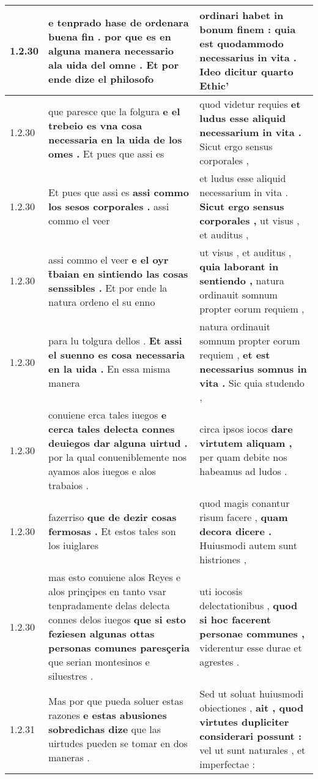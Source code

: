 \begin{tabular}{|p{1cm}|p{6.5cm}|p{6.5cm}|}
1.2.30 & e tenprado hase de ordenara buena fin . \textbf{ por que es en alguna manera necessario ala uida del omne . } Et por ende dize el philosofo & ordinari habet in bonum finem : \textbf{ quia est quodammodo necessarius in vita . } Ideo dicitur quarto Ethic’ \\\hline
1.2.30 & que paresce que la folgura \textbf{ e el trebeio es vna cosa necessaria en la uida de los omes . } Et pues que assi es & quod videtur requies \textbf{ et ludus esse aliquid necessarium in vita . } Sicut ergo sensus corporales , \\\hline
1.2.30 & Et pues que assi es \textbf{ assi commo los sesos corporales . } assi commo el veer & et ludus esse aliquid necessarium in vita . \textbf{ Sicut ergo sensus corporales , } ut visus , et auditus , \\\hline
1.2.30 & assi commo el veer \textbf{ e el oyr t̃baian en sintiendo las cosas senssibles . } Et por ende la natura ordeno el su enno & ut visus , et auditus , \textbf{ quia laborant in sentiendo , } natura ordinauit somnum propter eorum requiem , \\\hline
1.2.30 & para lu tolgura dellos . \textbf{ Et assi el suenno es cosa necessaria en la uida . } En essa misma manera & natura ordinauit somnum propter eorum requiem , \textbf{ et est necessarius somnus in vita . } Sic quia studendo , \\\hline
1.2.30 & conuiene erca tales iuegos \textbf{ e cerca tales delecta connes deuiegos dar alguna uirtud . } por la qual conueniblemente nos ayamos alos iuegos e alos trabaios . & circa ipsos iocos \textbf{ dare virtutem aliquam , } per quam debite nos habeamus ad ludos . \\\hline
1.2.30 & fazerriso \textbf{ que de dezir cosas fermosas . } Et estos tales son los iuiglares & quod magis conantur risum facere , \textbf{ quam decora dicere . } Huiusmodi autem sunt histriones , \\\hline
1.2.30 & mas esto conuiene alos Reyes e alos prinçipes en tanto vsar tenpradamente delas delecta connes delos iuegos \textbf{ que si esto feziesen algunas ottas personas comunes paresçeria } que serian montesinos e siluestres . & uti iocosis delectationibus , \textbf{ quod si hoc facerent personae communes , } viderentur esse durae et agrestes . \\\hline
1.2.31 & Mas por que pueda soluer estas razones \textbf{ e estas abusiones sobredichas dize } que las uirtudes pueden se tomar en dos maneras . & Sed ut soluat huiusmodi obiectiones , \textbf{ ait , quod virtutes dupliciter considerari possunt : } vel ut sunt naturales , et imperfectae : \\\hline

\end{tabular}

